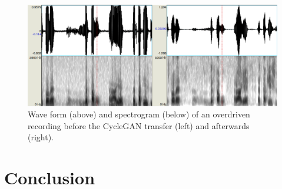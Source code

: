 \documentclass[runningheads]{llncs}
\begin{document}
\begin{figure}[htpb]
\includegraphics[scale=0.4]{rc/overdrive.eps}
\caption{Wave form (above) and spectrogram (below) of an overdriven recording
before the CycleGAN transfer (left) and afterwards (right).}
\label{fig:overdrive}
\end{figure}

%
%
%
%
%

\section{Conclusion}
\end{document}
